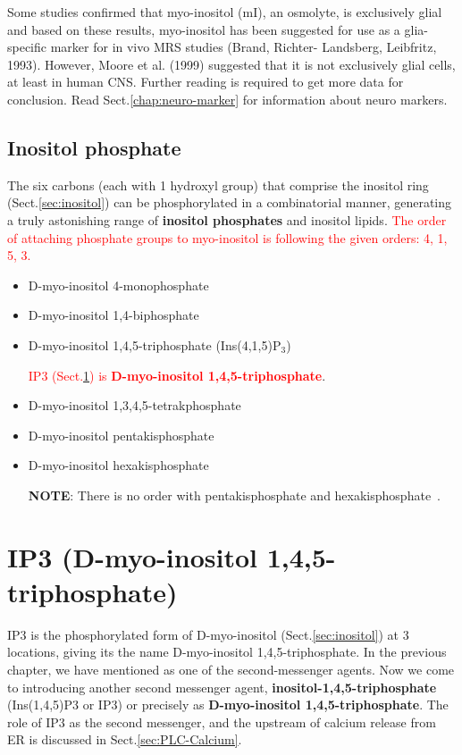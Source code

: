 Some studies confirmed that myo-inositol (mI), an osmolyte, is exclusively glial
and based on these results, myo-inositol has been suggested for use as a
glia-specific marker for in vivo MRS studies (Brand, Richter- Landsberg,
Leibfritz, 1993).
However, Moore et al. (1999) suggested that it is not exclusively glial cells,
at least in human CNS. Further reading is required to get more data for
conclusion. Read Sect.\ref{chap:neuro-marker} for information about neuro
markers.


\subsection{Inositol phosphate}
\label{sec:inositol-phosphate}

The six carbons (each with 1 hydroxyl group) that comprise the inositol ring
(Sect.\ref{sec:inositol}) can be phosphorylated in a combinatorial manner,
generating a truly astonishing range of {\bf inositol phosphates} and inositol
lipids. \textcolor{red}{The order of attaching phosphate groups to myo-inositol
is following the given orders: 4, 1, 5, 3.} 

\begin{itemize}
\item D-myo-inositol 4-monophosphate
\item D-myo-inositol 1,4-biphosphate
\item D-myo-inositol 1,4,5-triphosphate (Ins(4,1,5)P$_3$)

\textcolor{red}{IP3 (Sect.\ref{sec:IP3}) is {\bf D-myo-inositol
1,4,5-triphosphate}}.

\item D-myo-inositol 1,3,4,5-tetrakphosphate
\item D-myo-inositol pentakisphosphate
\item D-myo-inositol hexakisphosphate

{\bf NOTE}: There is no order with pentakisphosphate and
hexakisphosphate~\citep{berridge1989ipa}.
\end{itemize}


\section{IP3 (D-myo-inositol 1,4,5-triphosphate)}
\label{sec:IP3}
\label{sec:IP3_structure}

IP3 is the phosphorylated form of D-myo-inositol (Sect.\ref{sec:inositol}) at 3
locations, giving its the name D-myo-inositol 1,4,5-triphosphate.
In the previous chapter, we have mentioned  as one of the
second-messenger agents. Now we come to introducing another second messenger
agent, {\bf inositol-1,4,5-triphosphate} (Ins(1,4,5)P3 or IP3) or precisely as
{\bf D-myo-inositol 1,4,5-triphosphate}. The role of IP3 as the second
messenger, and the upstream of calcium release from ER is discussed in
Sect.\ref{sec:PLC-Calcium}.


